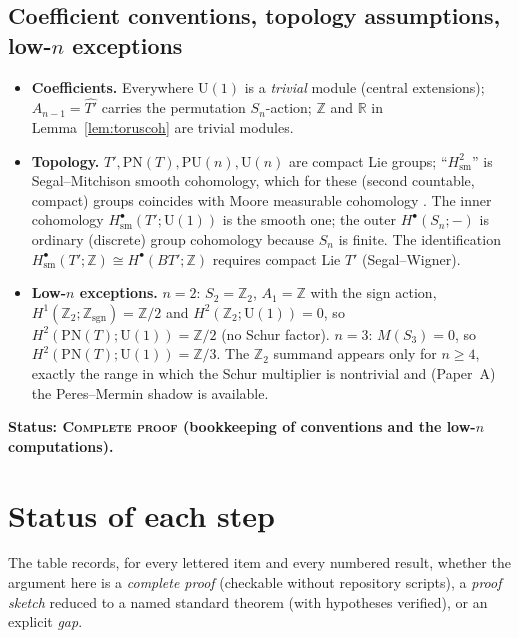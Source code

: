 \documentclass[11pt]{article}
\theoremstyle{definition}
\newcommand{\U}{\mathrm{U}}
\newcommand{\PU}{\mathrm{PU}}
\newcommand{\PN}{\mathrm{PN}}
\newcommand{\Z}{\mathbb{Z}}
\newcommand{\R}{\mathbb{R}}
\newcommand{\Tp}{T'}
\newcommand{\Thatp}{\widehat{T'}}
\newcommand{\sm}{\mathrm{sm}}
\newcommand{\STAT}[1]{\noindent\textbf{Status: #1}}
\newcommand{\COMPLETE}{\textsc{Complete proof}}
\begin{document}
\subsection{Coefficient conventions, topology assumptions, low-$n$ exceptions}

\begin{itemize}
\item \textbf{Coefficients.} Everywhere $\U(1)$ is a \emph{trivial} module (central
extensions); $A_{n-1}=\Thatp$ carries the permutation $S_n$-action; $\Z$ and $\R$ in
Lemma~\ref{lem:toruscoh} are trivial modules.
\item \textbf{Topology.} $\Tp,\PN(T),\PU(n),\U(n)$ are compact Lie groups; ``$H^2_{\sm}$''
is Segal--Mitchison smooth cohomology, which for these (second countable, compact) groups
coincides with Moore measurable cohomology \cite{MooreIII,WagnerAustin}. The inner
cohomology $H^{\bullet}_{\sm}(\Tp;\U(1))$ is the smooth one; the outer $H^{\bullet}(S_n;-)$
is ordinary (discrete) group cohomology because $S_n$ is finite. The identification
$H^{\bullet}_{\sm}(\Tp;\Z)\cong H^{\bullet}(B\Tp;\Z)$ requires compact Lie $\Tp$
(Segal--Wigner).
\item \textbf{Low-$n$ exceptions.} $n=2$: $S_2=\Z_2$, $A_1=\Z$ with the sign action,
$H^1(\Z_2;\Z_{\mathrm{sgn}})=\Z/2$ and $H^2(\Z_2;\U(1))=0$, so $H^2(\PN(T);\U(1))=\Z/2$
(no Schur factor). $n=3$: $M(S_3)=0$, so $H^2(\PN(T);\U(1))=\Z/3$. The $\Z_2$ summand
appears only for $n\ge4$, exactly the range in which the Schur multiplier is nontrivial and
(Paper~A) the Peres--Mermin shadow is available.
\end{itemize}
\STAT{\COMPLETE{} (bookkeeping of conventions and the low-$n$ computations).}

\section{Status of each step}\label{sec:status}

The table records, for every lettered item and every numbered result, whether the argument
here is a \emph{complete proof} (checkable without repository scripts), a \emph{proof
sketch} reduced to a named standard theorem (with hypotheses verified), or an explicit
\emph{gap}.
\end{document}
